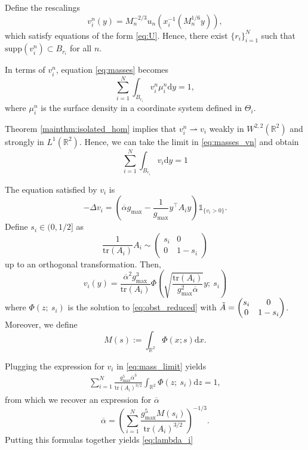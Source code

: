\documentclass[10pt,a4paper]{article}
\newcommand{\gmax}{g_{\mathrm{max}}}
\newcommand{\RR}{\mathbb{R}}
\newcommand{\supp}{\mathrm{supp}}
\numberwithin{equation}{section}
\begin{document}
Define the rescalings 
\[
	v^{n}_i(y)= M_n^{-2/3} u_{n}(x_i^{-1}(M_n^{1/6}y)),
\]
which satisfy equations of the form \eqref{eq:U}. Hence, there exist $ \{r_i\}_{i=1}^{N}$ such that $ \supp(v^{n}_i) \subset B_{r_i} $ for all $ n $.

In terms of $v_i^{n}$, equation \eqref{eq:masses} becomes
\begin{equation}
	\label{eq:masses_vn}
	\sum_{i=1}^{N} \int_{B_{r_i}}v^{n}_i \mu_i^{n}\mathrm{d}y  = 1,
\end{equation}
where $ \mu^n_i $ is the surface density in a coordinate system defined in $ \Theta_i $.

Theorem \ref{mainthm:isolated_hom} implies that $v_{i}^{n} \rightharpoonup v_i$ weakly in $ W^{2,2}(\RR^{2}) $ and strongly in $ L^{1}(\RR^{2}) $. Hence, we can take the limit in \eqref{eq:masses_vn} and obtain 
\begin{equation}
\label{eq:mass_limit}
\sum_{i=1}^{N} \int_{B_{r_i}}v_i \mathrm{d}y = 1
\end{equation}

The equation satisfied by $v_i$ is 
\[
	-\Delta v_i = \left( \overline{\alpha} \gmax - \frac{1}{\gmax} y^{\top} A_i y \right) \mathbb{1}_{\{v_i>0\}}.
\]
Define $s_i \in (0, 1/2]$ as 
\[ 
	\frac{1}{\text{tr}(A_i)} A_i \sim \begin{pmatrix}
		s_i & 0 \\
		0 & 1 - s_i
\end{pmatrix}
\]
up to an orthogonal transformation. Then, 
\[
	v_i(y) = \frac{\overline{\alpha}^{2} \gmax^{3}}{\text{tr}(A_i)} \Phi \left( \sqrt{\frac{\text{tr}(A_i)}{\gmax^{2} \overline{\alpha}}} y ;~ s_i\right) 
\]
where $\Phi(z;~s_i)$ is the solution to \eqref{eq:obst_reduced} with $\Tilde{A} = \begin{pmatrix} s_i & 0 \\ 0 & 1-s_i \end{pmatrix}$. Moreover, we define
\begin{equation}
	\label{eq:mass_def}
	M(s) := \int_{\RR^{2}} \Phi(x;s) \mathrm{d}x. 
\end{equation}

Plugging the expression for $v_i$ in \eqref{eq:mass_limit} yields
\begin{align*}
	\sum_{i=1}^{N} \frac{\gmax^{5} \overline{\alpha}^{3}}{\text{tr}(A_i)^{3/2}} \int_{\RR^{2}} \Phi(z;~ s_i) \mathrm{d}z = 1, 
\end{align*}
from which we recover an expression for $\overline{\alpha}$
\[
	\overline{\alpha} = \left( \sum_{i=1}^{N} \frac{\gmax^{5} M(s_i)}{\text{tr}(A_i)^{3/2}} \right)^{-1/3}.
\]
Putting this formulas together yields \eqref{eq:lambda_i} 
\end{document}
